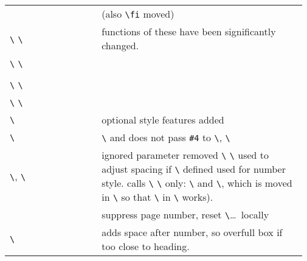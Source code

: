 \documentclass[pagesize=auto, numbers=enddot]{scrartcl}
\makeatletter
\newcommand*{\cs}[1]{\texttt{\textbackslash#1}}
\newcommand*{\cmd}[1]{\cs{\expandafter\@gobble\string#1}}
\makeatother
\begin{document}
\begin{flushleft}
  \begin{tabular}{@{}>{\raggedright\arraybackslash}p{0.3\linewidth}p{0.67\linewidth}@{}}
    \cmd{\part} \cmd{\@part} \cmd{\@spart} \cmd{\@endpart} \cmd{\@chapter} \cmd{\@schapter} & (also \cs{fi} moved) \\
    \cmd{\@makechapterhead} \cmd{\@makeschapterhead} & functions of these have been significantly changed. \\
    \cmd{\ps@headings} \cmd{\ps@myheadings} \\
    \cmd{\section} \cmd{\subsection} \cmd{\subsubsection} \cmd{\paragraph} \cmd{\subparagraph} \\
    \cmd{\thebibliography} \cmd{\theindex} \\
    \cmd{\@begintheorem} \cmd{\@oparbegintheorem} \\
    \cmd{\@makecaption} & optional style features added \\
    \cmd{\@startsection} & \cmd{\fpind} and does not pass \verb|#4| to \cmd{\@sect}, \cmd{\@ssect} \\
    \cmd{\@sect}, \cmd{\@ssect} & ignored parameter removed \newline \cmd{\llap} \cmd{\@secdot} used to adjust spacing if \cmd{\p@section} defined used for number style. calls \cmd{\@makesecdot} \newline \cmd{\@sect} only: \cmd{\@makesvsec} and \cmd{\@contmark}, which is moved in \cmd{\@svsechd} so that \cmd{\unskip} in \cmd{\@xsect} works). \\
    \cmd{\maketitle} \cmd{\@maketitle} & suppress page number, reset \cmd{\@title}\dots\ locally \\
    \cmd{\numberline} & adds space after number, so overfull box if too close to heading. \\
  \end{tabular}
\end{flushleft}
\end{document}
